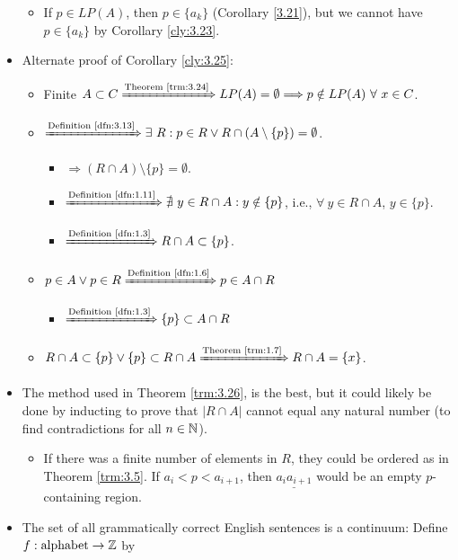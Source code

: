 \documentclass[titlepage]{report}
\begin{document}
\begin{itemize}
\begin{itemize}
        \item If $p\in LP(A)$, then $p\in\{a_k\}$ (Corollary \ref{3.21}), but we cannot have $p\in\{a_k\}$ by Corollary \ref{cly:3.23}.
    \end{itemize}
    \item Alternate proof of Corollary \ref{cly:3.25}:
    \begin{itemize}
        \item Finite $A\subset C \xRightarrow{\text{Theorem \ref{trm:3.24}}} LP(A)=\emptyset \Longrightarrow p\notin LP(A)\ \forall\ x\in C$.
        \item $\xRightarrow{\text{Definition \ref{dfn:3.13}}} \exists\ R:p\in R\vee R\cap(A\setminus\{p\})=\emptyset$.
        \begin{itemize}
            \item $\Rightarrow (R\cap A)\setminus\{p\}=\emptyset$.
            \item $\xRightarrow{\text{Definition \ref{dfn:1.11}}}\nexists\ y\in R\cap A:y\notin\{p\}$, i.e., $\forall\ y\in R\cap A$, $y\in\{p\}$.
            \item $\xRightarrow{\text{Definition \ref{dfn:1.3}}}R\cap A\subset\{p\}$.
        \end{itemize}
        \item $p\in A\vee p\in R \xRightarrow{\text{Definition \ref{dfn:1.6}}}p\in A\cap R$
        \begin{itemize}
            \item $\xRightarrow{\text{Definition \ref{dfn:1.3}}}\{p\}\subset A\cap R$
        \end{itemize}
        \item $R\cap A\subset\{p\}\vee\{p\}\subset R\cap A \xRightarrow{\text{Theorem \ref{trm:1.7}}} R\cap A=\{x\}$.
    \end{itemize}
    \item The method used in Theorem \ref{trm:3.26}, is the best, but it could likely be done by inducting to prove that $|R\cap A|$ cannot equal any natural number (to find contradictions for all $n\in\mathbb{N}$).
    \begin{itemize}
        \item If there was a finite number of elements in $R$, they could be ordered as in Theorem \ref{trm:3.5}. If $a_i<p<a_{i+1}$, then $\underline{a_ia_{i+1}}$ would be an empty $p$-containing region.
    \end{itemize}
    \item The set of all grammatically correct English sentences is a continuum: Define $f:\text{alphabet}\to\mathbb{Z}$ by

\end{itemize}
\end{document}
